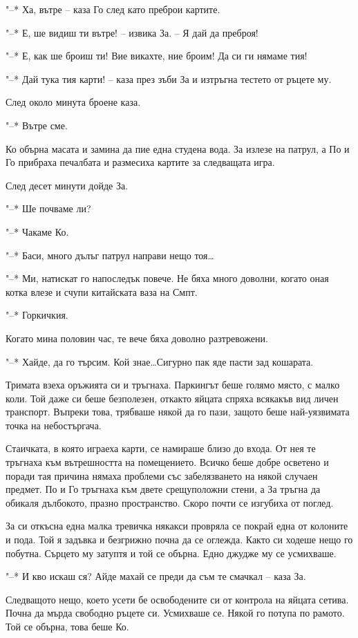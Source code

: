\documentclass[ebook,openany,12pt]{memoir}
\begin{document}
"--* Ха, вътре – каза Го след като преброи картите.

"--* Е, ше видиш ти вътре! – извика За. – Я дай да преброя!

"--* Е, как ше броиш ти! Вие викахте, ние броим! Да си ги нямаме тия!

"--* Дай тука тия карти! – каза през зъби За и изтръгна тестето от ръцете му.

След около минута броене каза.

"--* Вътре сме.

Ко обърна масата и замина да пие една студена вода. За излезе на патрул, а По и Го прибраха печалбата и размесиха картите за следващата игра.

След десет минути дойде За.

"--* Ше почваме ли?

"--* Чакаме Ко.

"--* Баси, много дълъг патрул направи нещо тоя\ldots

"--* Ми, натискат го напоследък повече. Не бяха много доволни, когато оная котка влезе и счупи китайската ваза на Смпт.

"--* Горкичкия.

Когато мина половин час, те вече бяха доволно разтревожени.

"--* Хайде, да го търсим. Кой знае\ldots Сигурно пак яде пасти зад кошарата.

Тримата взеха оръжията си и тръгнаха. Паркингът беше голямо място, с малко коли. Той даже си беше безполезен, откакто яйцата спряха всякакъв вид личен транспорт. Въпреки това, трябваше някой да го пази, защото беше най-уязвимата точка на небостъргача.

Стаичката, в която играеха карти, се намираше близо до входа. От нея те тръгнаха към вътрешността на помещението. Всичко беше добре осветено и поради тая причина нямаха проблеми със забелязването на някой случаен предмет. По и Го тръгнаха към двете срещуположни стени, а За тръгна да обикаля дълбокото, празно пространство. Скоро почти се изгубиха от поглед.

За си откъсна една малка тревичка някакси провряла се покрай една от колоните и пода. Той я задъвка и безгрижно почна да се оглежда. Както си ходеше нещо го побутна. Сърцето му затуптя и той се обърна. Едно джудже му се усмихваше.

"--* И кво искаш ся? Айде махай се преди да съм те смачкал -- каза За.

Следващото нещо, което усети бе освободените си от контрола на яйцата сетива. Почна да мърда свободно ръцете си. Усмихваше се. Някой го потупа по рамото. Той се обърна, това беше Ко.
\end{document}
